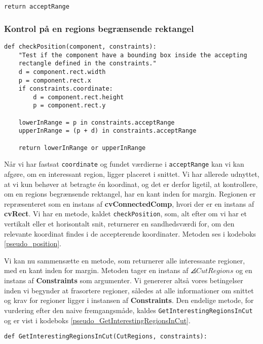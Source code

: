 {\begin{lstlisting}[caption={Metode som genererer sættet af accepterende
    koordinater.},captionpos=b,label={pseudo_acceptRange},
    frame=tb, breaklines=false, float]
    return acceptRange
\end{lstlisting}

\subsubsection{Kontrol på en regions begrænsende rektangel}
\begin{lstlisting}[caption={Metode, som kontrollerer, hvorvidt en region
    har en kant af det begrænsende rektangel inden for margin.},
    captionpos=b, label={pseudo_position}, frame=tb, breaklines=false,
    float]
def checkPosition(component, constraints):
    "Test if the component have a bounding box inside the accepting
    rectangle defined in the constraints."
    d = component.rect.width
    p = component.rect.x
    if constraints.coordinate:
        d = component.rect.height
        p = component.rect.y

    lowerInRange = p in constraints.acceptRange
    upperInRange = (p + d) in constraints.acceptRange

    return lowerInRange or upperInRange
\end{lstlisting}
Når vi har fastsat \texttt{coordinate} og fundet værdierne i
\texttt{acceptRange} kan vi kan afgøre, om en interessant region, ligger
placeret i snittet. Vi har allerede udnyttet, at vi kun behøver at
betragte én koordinat, og det er derfor ligetil, at kontrollere, om en
regions begrænsende rektangel, har en kant inden for margin. Regionen er
repræsenteret som en instans af \textbf{cvConnectedComp}, hvori der er
en instans af \textbf{cvRect}. Vi har en metode, kaldet
\texttt{checkPosition}, som, alt efter om vi har et vertikalt eller et
horisontalt snit, returnerer en sandhedsværdi for, om den relevante
koordinat findes i de accepterende koordinater. Metoden ses i kodeboks
\ref{pseudo_position}.

Vi kan nu sammensætte en metode, som returnerer alle interessante
regioner, med en kant inden for margin. Metoden tager en instans af
$\angles{CutRegions}$ og en instans af \textbf{Constraints} som
argumenter. Vi genererer altså vores betingelser inden vi begynder at
frasortere regioner, således at alle informationer om snittet og krav
for regioner ligger i instansen af \textbf{Constraints}. Den endelige
metode, for vurdering efter den naive fremgangsmåde, kaldes
\texttt{GetInterestingRegionsInCut} og er vist i kodeboks
\ref{pseudo_GetInterestingRegionsInCut}.

\begin{lstlisting}[caption={Pseudokode, som returnerer alle interessante
    regioner, der har en kant, af deres begrænsende rektangel, inden for
    margin.},
    captionpos=b, label={pseudo_GetInterestingRegionsInCut}, frame=tb, breaklines=false,
    float]
def GetInterestingRegionsInCut(CutRegions, constraints):


\end{lstlisting}}
